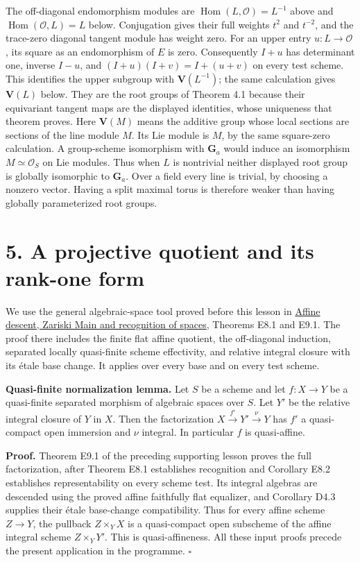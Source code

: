 \documentclass[11pt,a4paper,openany]{report}
\begin{document}
The off-diagonal endomorphism modules are \(\operatorname{Hom}(L,\mathcal O)=L^{-1}\) above and \(\operatorname{Hom}(\mathcal O,L)=L\) below. Conjugation gives their full weights \(t^2\) and \(t^{-2}\), and the trace-zero diagonal tangent module has weight zero. For an upper entry \(u:L\to\mathcal O\), its square as an endomorphism of \(E\) is zero. Consequently \(I+u\) has determinant one, inverse \(I-u\), and \((I+u)(I+v)=I+(u+v)\) on every test scheme. This identifies the upper subgroup with \(\mathbf V(L^{-1})\); the same calculation gives \(\mathbf V(L)\) below. They are the root groups of Theorem 4.1 because their equivariant tangent maps are the displayed identities, whose uniqueness that theorem proves. Here \(\mathbf V(M)\) means the additive group whose local sections are sections of the line module \(M\). Its Lie module is \(M\), by the same square-zero calculation. A group-scheme isomorphism with \(\mathbf G_a\) would induce an isomorphism \(M\simeq\mathcal O_S\) on Lie modules. Thus when \(L\) is nontrivial neither displayed root group is globally isomorphic to \(\mathbf G_a\). Over a field every line is trivial, by choosing a nonzero vector. Having a split maximal torus is therefore weaker than having globally parameterized root groups.

\section{5. A projective quotient and its rank-one form}\label{AG-RG-03-a-projective-quotient-and-its-rank-one-form}

We use the general algebraic-space tool proved before this lesson in \href{https://github.com/KokunoYumeto/open-math-courses/blob/main/docs/courses/AG-RG/AG-RG-S04.md}{Affine descent, Zariski Main and recognition of spaces}, Theorems E8.1 and E9.1. The proof there includes the finite flat affine quotient, the off-diagonal induction, separated locally quasi-finite scheme effectivity, and relative integral closure with its étale base change. It applies over every base and on every test scheme.

\textbf{Quasi-finite normalization lemma.} Let \(S\) be a scheme and let \(f:X\to Y\) be a quasi-finite separated morphism of algebraic spaces over \(S\). Let \(Y'\) be the relative integral closure of \(Y\) in \(X\). Then the factorization \(X\xrightarrow{f'}Y'\xrightarrow{\nu}Y\) has \(f'\) a quasi-compact open immersion and \(\nu\) integral. In particular \(f\) is quasi-affine.

\textbf{Proof.} Theorem E9.1 of the preceding supporting lesson proves the full factorization, after Theorem E8.1 establishes recognition and Corollary E8.2 establishes representability on every scheme test. Its integral algebras are descended using the proved affine faithfully flat equalizer, and Corollary D4.3 supplies their étale base-change compatibility. Thus for every affine scheme \(Z\to Y\), the pullback \(Z\times_YX\) is a quasi-compact open subscheme of the affine integral scheme \(Z\times_YY'\). This is quasi-affineness. All these input proofs precede the present application in the programme. \(\square\)
\end{document}
